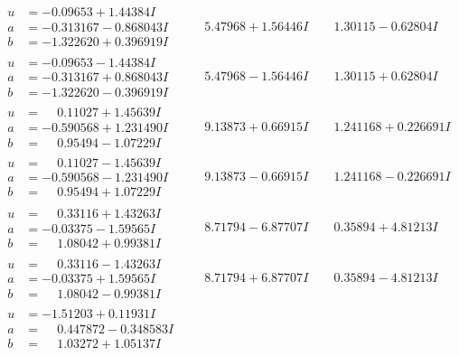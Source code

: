 \documentclass[1p]{elsarticle_modified}
\theoremstyle{definition}
\begin{document}
$$\begin{array}{c|c|c}
\begin{aligned}
u &= -0.09653 + 1.44384 I \\
a &= -0.313167 - 0.868043 I \\
b &= -1.322620 + 0.396919 I\end{aligned}
 & \phantom{-}5.47968 + 1.56446 I & \phantom{-}1.30115 - 0.62804 I \\ \hline\begin{aligned}
u &= -0.09653 - 1.44384 I \\
a &= -0.313167 + 0.868043 I \\
b &= -1.322620 - 0.396919 I\end{aligned}
 & \phantom{-}5.47968 - 1.56446 I & \phantom{-}1.30115 + 0.62804 I \\ \hline\begin{aligned}
u &= \phantom{-}0.11027 + 1.45639 I \\
a &= -0.590568 + 1.231490 I \\
b &= \phantom{-}0.95494 - 1.07229 I\end{aligned}
 & \phantom{-}9.13873 + 0.66915 I & \phantom{-}1.241168 + 0.226691 I \\ \hline\begin{aligned}
u &= \phantom{-}0.11027 - 1.45639 I \\
a &= -0.590568 - 1.231490 I \\
b &= \phantom{-}0.95494 + 1.07229 I\end{aligned}
 & \phantom{-}9.13873 - 0.66915 I & \phantom{-}1.241168 - 0.226691 I \\ \hline\begin{aligned}
u &= \phantom{-}0.33116 + 1.43263 I \\
a &= -0.03375 - 1.59565 I \\
b &= \phantom{-}1.08042 + 0.99381 I\end{aligned}
 & \phantom{-}8.71794 - 6.87707 I & \phantom{-}0.35894 + 4.81213 I \\ \hline\begin{aligned}
u &= \phantom{-}0.33116 - 1.43263 I \\
a &= -0.03375 + 1.59565 I \\
b &= \phantom{-}1.08042 - 0.99381 I\end{aligned}
 & \phantom{-}8.71794 + 6.87707 I & \phantom{-}0.35894 - 4.81213 I \\ \hline\begin{aligned}
u &= -1.51203 + 0.11931 I \\
a &= \phantom{-}0.447872 - 0.348583 I \\
b &= \phantom{-}1.03272 + 1.05137 I\end{aligned}

\end{array}$$
\end{document}
